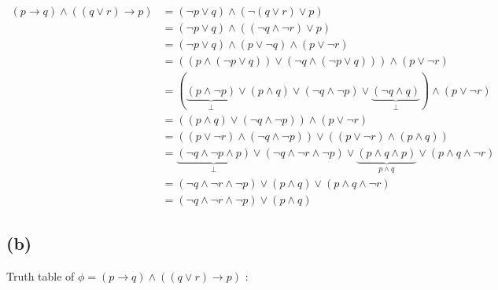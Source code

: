 \documentclass[a4paper,11pt]{report}
\begin{document}
\begin{align*}
  (p \rightarrow q) \wedge ((q \vee r) \rightarrow p) &= (\neg p \vee q) \wedge (\neg(q \vee r) \vee p) \\
                                                      &= (\neg p \vee q) \wedge ((\neg q \wedge \neg r) \vee p)\\
                                                      &= (\neg p \vee q) \wedge (p \vee \neg q) \wedge (p \vee \neg r)\\
                                                      &= ((p \wedge (\neg p \vee q)) \vee (\neg q \wedge (\neg p \vee q))) \wedge (p \vee \neg r)\\
                                                      &= (\underbrace{(p \wedge \neg p)}_{\bot} \vee (p \wedge q) \vee (\neg q \wedge \neg p) \vee \underbrace{(\neg q \wedge q)}_{\bot}) \wedge (p \vee \neg r)\\
                                                      &= ((p \wedge q)\vee(\neg q \wedge \neg p)) \wedge (p \vee \neg r)\\
                                                      &= ((p \vee \neg r) \wedge (\neg q \wedge \neg p)) \vee ((p \vee \neg r) \wedge (p \wedge q))\\
                                                      &= \underbrace{(\neg q \wedge \neg p \wedge p)}_{\bot} \vee (\neg q \wedge \neg r \wedge \neg p)\vee \underbrace{(p \wedge q \wedge p)}_{p \wedge q} \vee (p \wedge q \wedge \neg r)\\
                                                      &= (\neg q \wedge \neg r \wedge \neg p) \vee (p \wedge q) \vee (p \wedge q \wedge \neg r)\\
                                                      &= (\neg q \wedge \neg r \wedge \neg p) \vee (p \wedge q)
\end{align*}

\subsection*{(b)}

Truth table of $\phi = (p \rightarrow q) \wedge ((q \vee r) \rightarrow p)$ :
\end{document}
